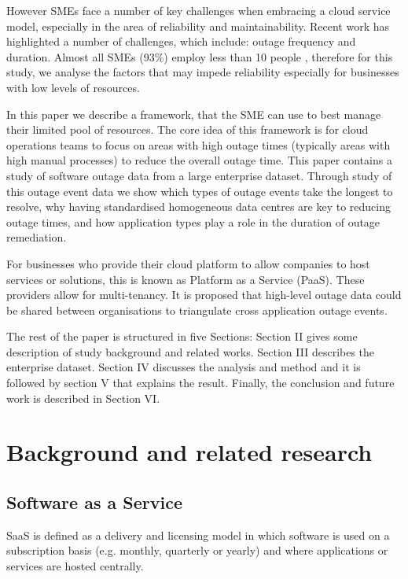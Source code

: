 \documentclass[conference]{IEEEtran}
\begin{document}
However SMEs face a number of key challenges when embracing a cloud service model, especially in the area of reliability and maintainability. Recent work has highlighted a number of challenges, which include: outage frequency and duration. Almost all SMEs (93\%) employ less than 10 people \cite{europa2015sme}, therefore for this study, 
we analyse the factors that may impede reliability especially for businesses  with low levels of resources. \par

In this paper we describe a framework, that the SME can use to best manage their limited pool of resources. The core idea of this framework is for cloud operations teams to focus on areas with high outage times (typically areas with high manual processes) to reduce the overall outage time. This paper contains a study of software outage data from a large enterprise dataset. Through study of this outage event data we show which types of outage events take the longest to resolve, why having standardised homogeneous data centres are key to reducing outage times, and how application types play a role in the duration of outage remediation. \par

For businesses who provide their cloud platform to allow companies to host services or solutions, this is known as Platform as a Service (PaaS). These providers allow for multi-tenancy. It is proposed that  high-level outage data could be shared between organisations to triangulate cross application outage events. \par

The rest of the paper is structured in five Sections: Section II gives some description of study background and related works. Section III describes the enterprise dataset. Section IV discusses the analysis and method and it is followed by section V that explains the result. Finally, the conclusion and future work is described in Section VI. \par


\section{Background and related research}

\subsection{Software as a Service}
SaaS is defined as a delivery and licensing model in which software is used on a subscription basis (e.g. monthly, quarterly or yearly) and where applications or services are hosted centrally. \par
\end{document}
